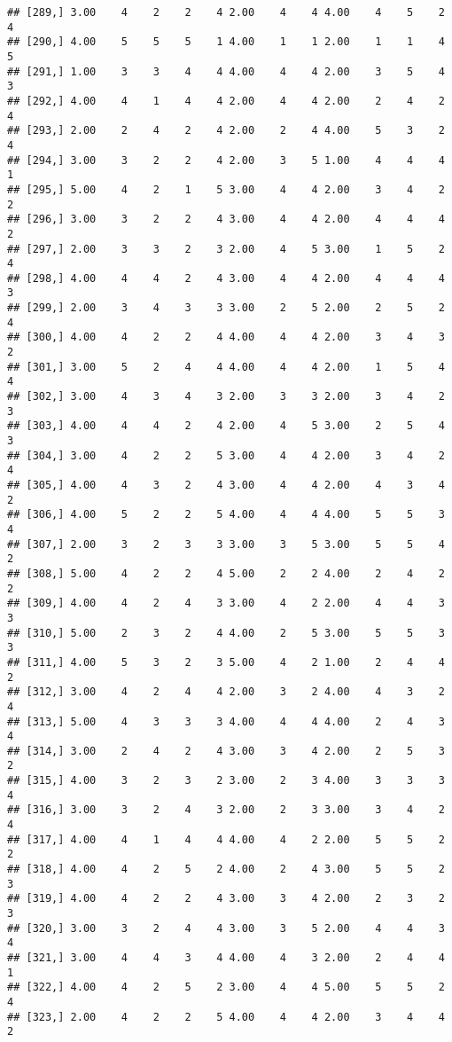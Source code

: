 \documentclass[]{article}
\begin{document}
\begin{verbatim}
## [289,] 3.00    4    2    2    4 2.00    4    4 4.00    4    5    2    4
## [290,] 4.00    5    5    5    1 4.00    1    1 2.00    1    1    4    5
## [291,] 1.00    3    3    4    4 4.00    4    4 2.00    3    5    4    3
## [292,] 4.00    4    1    4    4 2.00    4    4 2.00    2    4    2    4
## [293,] 2.00    2    4    2    4 2.00    2    4 4.00    5    3    2    4
## [294,] 3.00    3    2    2    4 2.00    3    5 1.00    4    4    4    1
## [295,] 5.00    4    2    1    5 3.00    4    4 2.00    3    4    2    2
## [296,] 3.00    3    2    2    4 3.00    4    4 2.00    4    4    4    2
## [297,] 2.00    3    3    2    3 2.00    4    5 3.00    1    5    2    4
## [298,] 4.00    4    4    2    4 3.00    4    4 2.00    4    4    4    3
## [299,] 2.00    3    4    3    3 3.00    2    5 2.00    2    5    2    4
## [300,] 4.00    4    2    2    4 4.00    4    4 2.00    3    4    3    2
## [301,] 3.00    5    2    4    4 4.00    4    4 2.00    1    5    4    4
## [302,] 3.00    4    3    4    3 2.00    3    3 2.00    3    4    2    3
## [303,] 4.00    4    4    2    4 2.00    4    5 3.00    2    5    4    3
## [304,] 3.00    4    2    2    5 3.00    4    4 2.00    3    4    2    4
## [305,] 4.00    4    3    2    4 3.00    4    4 2.00    4    3    4    2
## [306,] 4.00    5    2    2    5 4.00    4    4 4.00    5    5    3    4
## [307,] 2.00    3    2    3    3 3.00    3    5 3.00    5    5    4    2
## [308,] 5.00    4    2    2    4 5.00    2    2 4.00    2    4    2    2
## [309,] 4.00    4    2    4    3 3.00    4    2 2.00    4    4    3    3
## [310,] 5.00    2    3    2    4 4.00    2    5 3.00    5    5    3    3
## [311,] 4.00    5    3    2    3 5.00    4    2 1.00    2    4    4    2
## [312,] 3.00    4    2    4    4 2.00    3    2 4.00    4    3    2    4
## [313,] 5.00    4    3    3    3 4.00    4    4 4.00    2    4    3    4
## [314,] 3.00    2    4    2    4 3.00    3    4 2.00    2    5    3    2
## [315,] 4.00    3    2    3    2 3.00    2    3 4.00    3    3    3    4
## [316,] 3.00    3    2    4    3 2.00    2    3 3.00    3    4    2    4
## [317,] 4.00    4    1    4    4 4.00    4    2 2.00    5    5    2    2
## [318,] 4.00    4    2    5    2 4.00    2    4 3.00    5    5    2    3
## [319,] 4.00    4    2    2    4 3.00    3    4 2.00    2    3    2    3
## [320,] 3.00    3    2    4    4 3.00    3    5 2.00    4    4    3    4
## [321,] 3.00    4    4    3    4 4.00    4    3 2.00    2    4    4    1
## [322,] 4.00    4    2    5    2 3.00    4    4 5.00    5    5    2    4
## [323,] 2.00    4    2    2    5 4.00    4    4 2.00    3    4    4    2

\end{verbatim}
\end{document}
